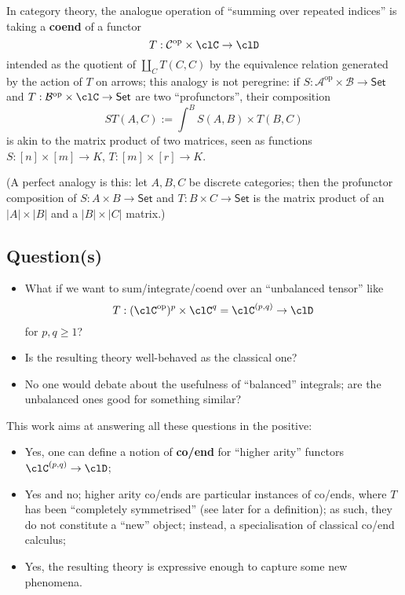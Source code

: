 \documentclass[11pt]{amsart}
\begin{document}
In category theory, the analogue operation of ``summing over repeated indices'' is taking a \textbf{coend} of a functor 
\[
T : \mathcal{C}^\text{op} \times \clC \to \clD
\] intended as the quotient  of \(\coprod_C T(C,C)\) by the equivalence relation generated by the action of \(T\) on arrows; this analogy is not peregrine: if \(S : \mathcal{A}^\text{op} \times \mathcal{B} \to \mathsf{Set}\) and \(T : \mathcal{B}^\text{op} \times \clC \to \mathsf{Set}\) are two ``profunctors'', their composition 
\[
ST(A,C) :=  \int^B S(A,B)\times T(B,C)
\] is akin to the matrix product of two matrices, seen as functions \(S : [n]\times [m] \to K\), \(T : [m]\times [r] \to K\).

(A perfect analogy is this: let $A,B,C$ be discrete categories; then the profunctor composition of \(S : A\times B \to \mathsf{Set}\) and \(T : B \times C \to \mathsf{Set}\) is the matrix product of an \(|A|\times |B|\) and a \(|B|\times |C|\) matrix.)

\subsection{Question(s)}
\label{sec:org1c57692}
\begin{itemize}
	\item What if we want to sum/integrate/coend over an ``unbalanced tensor'' like 
	\[
		T : (\clC^\text{op})^p \times \clC^q = \clC^{(p,q)} \to \clD
		\] for \(p,q\ge 1\)?
\item Is the resulting theory well-behaved as the classical one?
\item No one would debate about the usefulness of ``balanced'' integrals; are the unbalanced ones good for something similar?
\end{itemize}
		
		This work aims at answering all these questions in the positive:

\begin{itemize}
\item Yes, one can define a notion of \textbf{co/end} for ``higher arity'' functors \(\clC^{(p,q)} \to \clD\);
\item Yes and no; higher arity co/ends are particular instances of co/ends, where \(T\) has been ``completely symmetrised'' (see later for a definition); as such, they do not constitute a ``new'' object; instead, a specialisation of classical co/end calculus;
\item Yes, the resulting theory is expressive enough to capture some new phenomena.
\end{itemize}
\end{document}
